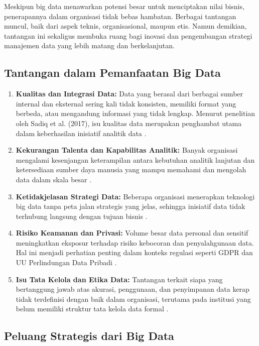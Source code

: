 Meskipun big data menawarkan potensi besar untuk menciptakan nilai bisnis, penerapannya dalam organisasi tidak bebas hambatan. Berbagai tantangan muncul, baik dari aspek teknis, organisasional, maupun etis. Namun demikian, tantangan ini sekaligus membuka ruang bagi inovasi dan pengembangan strategi manajemen data yang lebih matang dan berkelanjutan.

\subsection*{Tantangan dalam Pemanfaatan Big Data}

\begin{enumerate}
	\item \textbf{Kualitas dan Integrasi Data:} Data yang berasal dari berbagai sumber internal dan eksternal sering kali tidak konsisten, memiliki format yang berbeda, atau mengandung informasi yang tidak lengkap. Menurut penelitian oleh Sadiq et al. (2017), isu kualitas data merupakan penghambat utama dalam keberhasilan inisiatif analitik data \cite{sadiq2017}.
	
	\item \textbf{Kekurangan Talenta dan Kapabilitas Analitik:} Banyak organisasi mengalami kesenjangan keterampilan antara kebutuhan analitik lanjutan dan ketersediaan sumber daya manusia yang mampu memahami dan mengolah data dalam skala besar \cite{deloitte2021}.
	
	\item \textbf{Ketidakjelasan Strategi Data:} Beberapa organisasi menerapkan teknologi big data tanpa peta jalan strategis yang jelas, sehingga inisiatif data tidak terhubung langsung dengan tujuan bisnis \cite{schroeck2012}.
	
	\item \textbf{Risiko Keamanan dan Privasi:} Volume besar data personal dan sensitif meningkatkan eksposur terhadap risiko kebocoran dan penyalahgunaan data. Hal ini menjadi perhatian penting dalam konteks regulasi seperti GDPR dan UU Perlindungan Data Pribadi \cite{zwitter2014}.
	
	\item \textbf{Isu Tata Kelola dan Etika Data:} Tantangan terkait siapa yang bertanggung jawab atas akurasi, penggunaan, dan penyimpanan data kerap tidak terdefinisi dengan baik dalam organisasi, terutama pada institusi yang belum memiliki struktur tata kelola data formal \cite{otieno2021}.
\end{enumerate}

\subsection*{Peluang Strategis dari Big Data}

